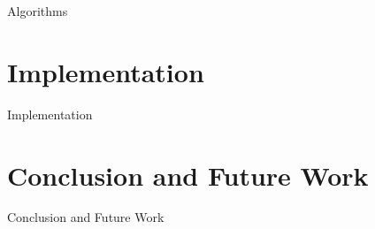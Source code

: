 \documentclass{beamer}
\begin{document}
\begin{frame}{Algorithms}
  
\end{frame}


\section{Implementation}

\begin{frame}{Implementation}
  
\end{frame}


\section{Conclusion and Future Work}

\begin{frame}{Conclusion and Future Work}
  
\end{frame}



\end{document}
